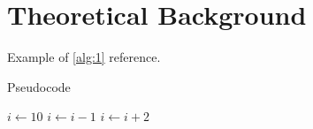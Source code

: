 
\chapter{Theoretical Background}
\label{chp:theoretical_background}

Example of \autoref{alg:1} reference.

\begin{algorithm}
    \caption{Pseudocode}
    \label{alg:1}
    \begin{algorithmic}
        \STATE $i\gets 10$
          \STATE $i\gets i-1$
        \ELSE
            \STATE $i\gets i+2$
          \ENDIF
        \ENDIF 
    \end{algorithmic}
\end{algorithm}